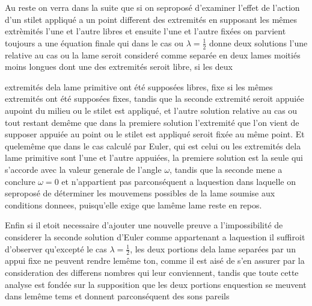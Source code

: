 \documentclass[11pt,a4paper]{article}
\begin{document}
Au reste on verra dans la suite que si on seproposé d'examiner l'effet de l'action
d'un stilet appliqué a un point different des extremités en supposant les mêmes
extrèmités l'une et l'autre libres et ensuite l'une et l'autre fixées on parvient
toujours a une équation finale qui dans le cas ou $\lambda=\frac{1}{2}$ donne deux solutions
l'une relative au cas ou la lame seroit consideré comme separée en deux
lames moitiés moins longues dont une des extremités seroit libre, si les deux


extremités dela lame primitive ont été supposées libres, fixe si les mêmes extremités
ont été supposées fixes, tandis que la seconde extremité seroit appuiée aupoint du
milieu ou le stilet est appliqué, et l'autre solution relative au cas ou tout restant
demême que dans  la premiere solution l'extremité que l'on vient de
supposer appuiée au point ou le stilet est appliqué seroit fixée au même point.
Et quelemême que dans le cas calculé par Euler, qui est celui ou les extremités dela
lame primitive sont l'une et l'autre appuiées, la premiere solution est la seule
qui s'accorde avec la valeur generale de l'angle $\omega$, tandis que la seconde
mene a conclure $\omega=0$ et n'appartient pas parconséquent a laquestion dans
laquelle on seproposé de déterminer les mouvemens possibles de la lame soumise
aux conditions donnees, puisqu'elle exige que lamême lame reste en repos.

Enfin si il etoit necessaire d'ajouter une nouvelle preuve a l'impossibilité de
considerer la seconde solution d'Euler comme appartenant a laquestion il suffiroit
d'observer qu'excepté le cas $\lambda=\frac{1}{2}$, les deux portions dela lame separées
par un appui fixe ne peuvent rendre lemême ton, comme il est aisé de s'en assurer
par la consideration des differens nombres qui leur conviennent, tandis que toute
cette analyse est fondée sur la supposition que les deux portions enquestion se
meuvent dans lemême tems et donnent parconséquent des sons pareils
\end{document}
